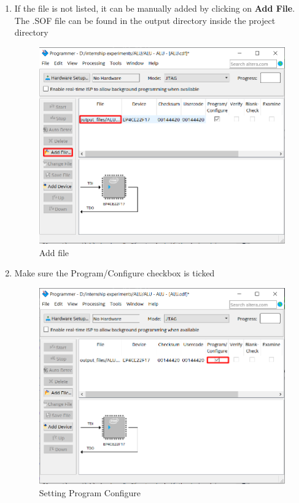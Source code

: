 \documentclass[12pt,singleside,a4paper]{article}
\begin{document}
\begin{enumerate}
     \item If the file is not listed, it can be manually added by clicking on \textbf{Add File}. The .SOF file can be found in the output directory inside the project directory 
     \begin{figure}[H]
         \centering
         \includegraphics[scale=0.6]{download4.png}
     \caption{Add file}
     \end{figure}
     \newpage
     \item Make sure the Program/Configure checkbox is ticked
     \begin{figure}[H]
         \centering
         \includegraphics[width=14cm,keepaspectratio]{download5.png}
     \caption{Setting Program Configure}
     \end{figure}
     

\end{enumerate}
\end{document}
